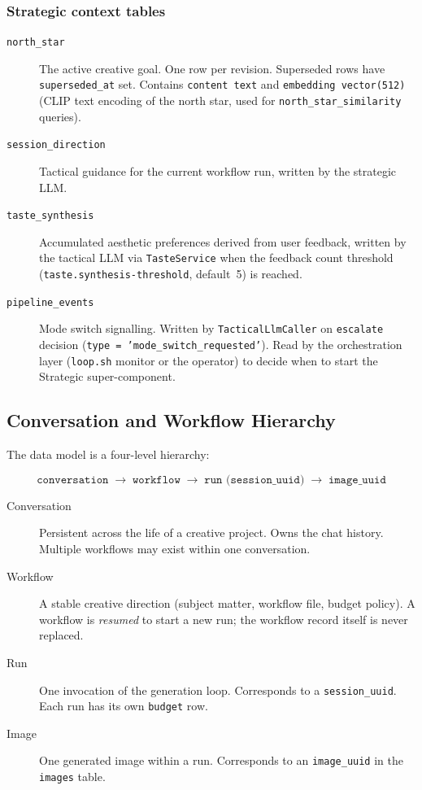 \documentclass[11pt,letterpaper]{article}
\begin{document}
\subsubsection{Strategic context tables}

\begin{description}
  \item[\texttt{north\_star}] The active creative goal. One row per revision.
        Superseded rows have \texttt{superseded\_at} set. Contains
        \texttt{content text} and \texttt{embedding vector(512)} (CLIP text
        encoding of the north star, used for \texttt{north\_star\_similarity}
        queries).
  \item[\texttt{session\_direction}] Tactical guidance for the current
        workflow run, written by the strategic LLM.
  \item[\texttt{taste\_synthesis}] Accumulated aesthetic preferences derived
        from user feedback, written by the tactical LLM via \texttt{TasteService}
        when the feedback count threshold (\texttt{taste.synthesis-threshold},
        default~5) is reached.
  \item[\texttt{pipeline\_events}] Mode switch signalling. Written by
        \texttt{TacticalLlmCaller} on \texttt{escalate} decision
        (\texttt{type = 'mode\_switch\_requested'}). Read by the
        orchestration layer (\texttt{loop.sh} monitor or the operator) to
        decide when to start the Strategic super-component.
\end{description}

\subsection{Conversation and Workflow Hierarchy}

The data model is a four-level hierarchy:

\[
\texttt{conversation} \;\to\; \texttt{workflow} \;\to\; \texttt{run (session\_uuid)} \;\to\; \texttt{image\_uuid}
\]

\begin{description}
  \item[Conversation] Persistent across the life of a creative project. Owns
        the chat history. Multiple workflows may exist within one conversation.
  \item[Workflow] A stable creative direction (subject matter, workflow file,
        budget policy). A workflow is \textit{resumed} to start a new run;
        the workflow record itself is never replaced.
  \item[Run] One invocation of the generation loop. Corresponds to a
        \texttt{session\_uuid}. Each run has its own \texttt{budget} row.
  \item[Image] One generated image within a run. Corresponds to an
        \texttt{image\_uuid} in the \texttt{images} table.
\end{description}
\end{document}

